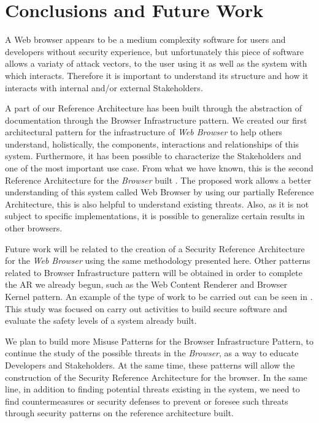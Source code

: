 \documentclass{sig-alternate-05-2015}
\begin{document}
\section*{Conclusions and Future Work}
A Web browser appears to be a medium complexity software for users and developers without security experience, but unfortunately this piece of software allows a variaty of attack vectors, to the user using it as well as the system with which interacts. Therefore it is important to understand its structure and how it interacts with internal and/or external Stakeholders.

A part of our Reference Architecture has been built through the abstraction of documentation through the Browser Infrastructure pattern. We created our first architectural pattern for the infrastructure of \textit{Web Browser} to help others understand, holistically, the components, interactions and relationships of this system. Furthermore, it has been possible to characterize the Stakeholders and one of the most important use case. From what we have known, this is the second Reference Architecture for the \textit{Browser} built \cite{2005-grosskurth-browser-refarch}. The proposed work allows a better understanding of this system called Web Browser by using our partially Reference Architecture, this is also helpful to understand existing threats. Also, as it is not subject to specific implementations, it is possible to generalize certain results in other browsers.

Future work will be related to the creation of a Security Reference Architecture for the \textit{Web Browser} using the same methodology presented here. Other patterns related to Browser Infrastructure pattern will be obtained in order to complete the AR we already begun, such as the Web Content Renderer and Browser Kernel pattern. An example of the type of work to be carried out can be seen in \cite{fernandez2014security}. This study was focused on carry out activities to build secure software and evaluate the safety levels of a system already built.

We plan to build more Misuse Patterns for the Browser Infrastructure Pattern, to continue the study of the possible threats in the \textit{Browser}, as a way to educate Developers and Stakeholders. At the same time, these patterns will allow the construction of the Security Reference Architecture for the browser. In the same line, in addition to finding potential threats existing in the system, we need to find countermeasures or security defenses to prevent or foresee such threats through security patterns on the reference architecture built.

  

\end{document}
